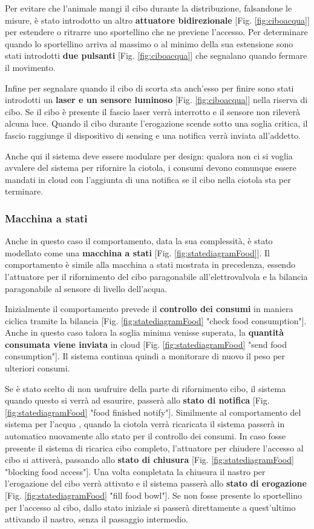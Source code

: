     Per evitare che l'animale mangi il cibo durante la distribuzione, falsandone le misure, è stato introdotto un altro \textbf{attuatore bidirezionale} [Fig. \ref{fig:ciboacqua}] per estendere o ritrarre uno sportellino che ne previene l'accesso.
    Per determinare quando lo sportellino arriva al massimo o al minimo della sua estensione sono stati introdotti \textbf{due pulsanti} [Fig. \ref{fig:ciboacqua}] che segnalano quando fermare il movimento. 
    
    Infine per segnalare quando il cibo di scorta sta anch'esso per finire sono stati introdotti un \textbf{laser e un sensore luminoso} [Fig. \ref{fig:ciboacqua}] nella riserva di cibo. Se il cibo è presente il fascio laser verrà interrotto e il sensore non rileverà alcuna luce. Quando il cibo durante l'erogazione scende sotto una soglia critica, il fascio raggiunge il dispositivo di sensing e una notifica verrà inviata all'addetto. 
    
    Anche qui il sistema deve essere modulare per design: qualora non ci si voglia avvalere del sistema per rifornire la ciotola, i consumi devono comunque essere mandati in cloud con l'aggiunta di una notifica se il cibo nella ciotola sta per terminare.
    
    \subsubsection{Macchina a stati} Anche in questo caso il comportamento, data la sua complessità, è stato modellato come una \textbf{macchina a stati} [Fig. \ref{fig:statediagramFood}]. Il comportamento è simile alla macchina a stati mostrata in precedenza, essendo l'attuatore per il rifornimento del cibo paragonabile all'elettrovalvola e la bilancia paragonabile al sensore di livello dell'acqua. 
    
    Inizialmente il comportamento prevede il \textbf{controllo dei consumi} in maniera ciclica tramite la bilancia [Fig. \ref{fig:statediagramFood} "check food consumption"].
    Anche in questo caso talora la soglia minima venisse superata, la \textbf{quantità consumata viene inviata} in cloud [Fig. \ref{fig:statediagramFood} "send food consumption"]. Il sistema continua quindi a monitorare di nuovo il peso per ulteriori consumi.
    
    Se è stato scelto di non usufruire della parte di rifornimento cibo, il sistema quando questo si verrà ad esaurire, passerà allo \textbf{stato di notifica} [Fig. \ref{fig:statediagramFood} "food finished notify"]. Similmente al comportamento del sistema per l'acqua , quando la ciotola verrà ricaricata il sistema passerà in automatico nuovamente allo stato per il controllo dei consumi.
    In caso fosse presente il sistema di ricarica cibo completo, l'attuatore per chiudere l'accesso al cibo si attiverà, passando allo \textbf{stato di chiusura} [Fig. \ref{fig:statediagramFood} "blocking food access"]. Una volta completata la chiusura il nastro per l'erogazione del cibo verrà attivato e il sistema passerà allo \textbf{stato di erogazione} [Fig. \ref{fig:statediagramFood} "fill food bowl"]. Se non fosse presente lo sportellino per l'accesso al cibo, dallo stato iniziale si passerà direttamente a quest'ultimo attivando il nastro, senza il passaggio intermedio. 
    
